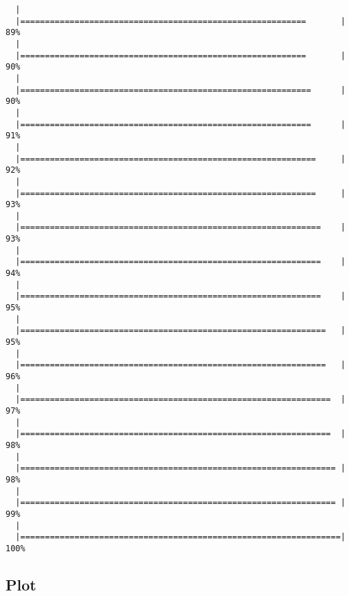 \documentclass[a4paper]{article}
\begin{document}
\begin{verbatim}
  |                                                                       
  |==========================================================       |  89%
  |                                                                       
  |==========================================================       |  90%
  |                                                                       
  |===========================================================      |  90%
  |                                                                       
  |===========================================================      |  91%
  |                                                                       
  |============================================================     |  92%
  |                                                                       
  |============================================================     |  93%
  |                                                                       
  |=============================================================    |  93%
  |                                                                       
  |=============================================================    |  94%
  |                                                                       
  |=============================================================    |  95%
  |                                                                       
  |==============================================================   |  95%
  |                                                                       
  |==============================================================   |  96%
  |                                                                       
  |===============================================================  |  97%
  |                                                                       
  |===============================================================  |  98%
  |                                                                       
  |================================================================ |  98%
  |                                                                       
  |================================================================ |  99%
  |                                                                       
  |=================================================================| 100%
\end{verbatim}

\subsection{Plot}\label{plot}
\end{document}
